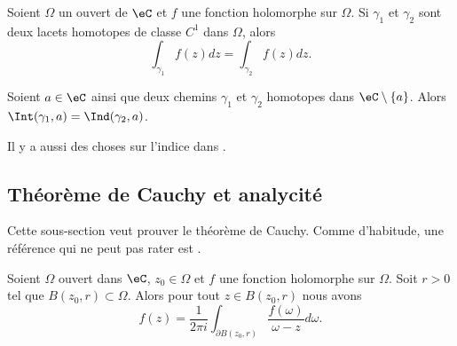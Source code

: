\begin{theorem}
    Soient \( \Omega\) un ouvert de \( \eC\) et \( f\) une fonction holomorphe sur \( \Omega\). Si \( \gamma_1\) et \( \gamma_2\) sont deux lacets homotopes de classe \( C^1\) dans \( \Omega\), alors
    \begin{equation}
        \int_{\gamma_1}f(z)dz=\int_{\gamma_2}f(z)dz.
    \end{equation}
\end{theorem}

\begin{corollary}   \label{CorGZXzuZR}
    Soient \( a\in \eC\) ainsi que deux chemins \( \gamma_1\) et \( \gamma_2\) homotopes dans \( \eC\setminus\{ a \}\). Alors \( \Int(\gamma_1,a)=\Ind(\gamma_2,a)\).
\end{corollary}
Il y a aussi des choses sur l'indice dans \cite{Holomorphieus}.


\subsection{Théorème de Cauchy et analycité}

Cette sous-section veut prouver le théorème de Cauchy. Comme d'habitude, une référence qui ne peut pas rater est \cite{Holomorphieus}.


\begin{theorem}    \label{ThoUHztQe}
    Soient \( \Omega\) ouvert dans \( \eC\), \( z_0\in \Omega\) et \( f\) une fonction holomorphe sur \( \Omega\). Soit \( r>0\) tel que \( B(z_0,r)\subset \Omega\). Alors pour tout \( z\in B(z_0,r)\) nous avons
    \begin{equation}    \label{EqPzUABM}
        f(z)=\frac{1}{ 2\pi i }\int_{\partial B(z_0,r)}\frac{ f(\omega) }{ \omega-z }d\omega.
    \end{equation}
\end{theorem}

